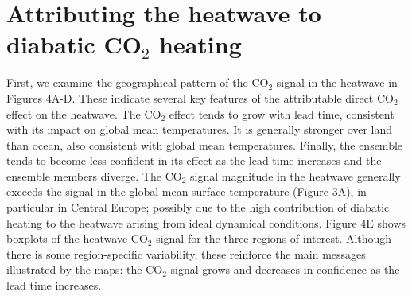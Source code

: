 \section{Attributing the heatwave to diabatic CO$_2$ heating}\label{Ch4:attribution}

  First, we examine the geographical pattern of the CO$_2$ signal in the heatwave in Figures 4A-D. These indicate several key features of the attributable direct CO$_2$ effect on the heatwave. The CO$_2$ effect tends to grow with lead time, consistent with its impact on global mean temperatures. It is generally stronger over land than ocean, also consistent with global mean temperatures. Finally, the ensemble tends to become less confident in its effect as the lead time increases and the ensemble members diverge. The CO$_2$ signal magnitude in the heatwave generally exceeds the signal in the global mean surface temperature (Figure 3A), in particular in Central Europe; possibly due to the high contribution of diabatic heating to the heatwave arising from ideal dynamical conditions. Figure 4E shows boxplots of the heatwave CO$_2$ signal for the three regions of interest. Although there is some region-specific variability, these reinforce the main messages illustrated by the maps: the CO$_2$ signal grows and decreases in confidence as the lead time increases.

